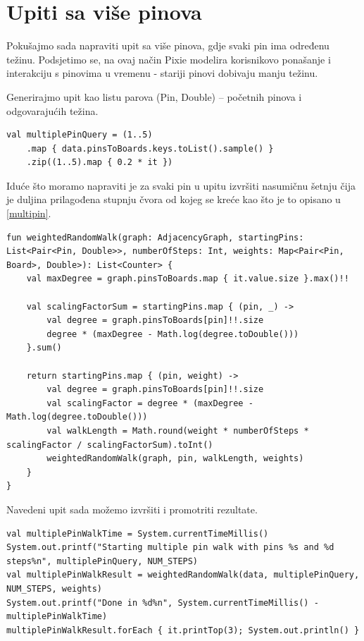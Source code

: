 \documentclass[times, utf8, seminar]{fer}
\begin{document}
\section{Upiti sa više pinova}

Pokušajmo sada napraviti upit sa više pinova, gdje svaki pin ima određenu težinu. Podsjetimo se, na ovaj način Pixie modelira korisnikovo ponašanje i interakciju s pinovima u vremenu - stariji pinovi dobivaju manju težinu.

Generirajmo upit kao listu parova (Pin, Double) -- početnih pinova i odgovarajućih težina.

\begin{lstlisting}
val multiplePinQuery = (1..5)
	.map { data.pinsToBoards.keys.toList().sample() }
	.zip((1..5).map { 0.2 * it })
\end{lstlisting}

Iduće što moramo napraviti je za svaki pin u upitu izvršiti nasumičnu šetnju čija je duljina prilagođena stupnju čvora od kojeg se kreće kao što je to opisano u \ref{multipin}.

\begin{lstlisting}
fun weightedRandomWalk(graph: AdjacencyGraph, startingPins: List<Pair<Pin, Double>>, numberOfSteps: Int, weights: Map<Pair<Pin, Board>, Double>): List<Counter> {
    val maxDegree = graph.pinsToBoards.map { it.value.size }.max()!!

    val scalingFactorSum = startingPins.map { (pin, _) ->
        val degree = graph.pinsToBoards[pin]!!.size
        degree * (maxDegree - Math.log(degree.toDouble()))
    }.sum()

    return startingPins.map { (pin, weight) ->
        val degree = graph.pinsToBoards[pin]!!.size
        val scalingFactor = degree * (maxDegree - Math.log(degree.toDouble()))
        val walkLength = Math.round(weight * numberOfSteps * scalingFactor / scalingFactorSum).toInt()
        weightedRandomWalk(graph, pin, walkLength, weights)
    }
}
\end{lstlisting}

Navedeni upit sada možemo izvršiti i promotriti rezultate.

\begin{lstlisting}
val multiplePinWalkTime = System.currentTimeMillis()
System.out.printf("Starting multiple pin walk with pins %s and %d steps%n", multiplePinQuery, NUM_STEPS)
val multiplePinWalkResult = weightedRandomWalk(data, multiplePinQuery, NUM_STEPS, weights)
System.out.printf("Done in %d%n", System.currentTimeMillis() - multiplePinWalkTime)
multiplePinWalkResult.forEach { it.printTop(3); System.out.println() }
\end{lstlisting}
\end{document}
